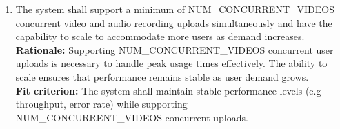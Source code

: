 \documentclass[12pt]{article}
\begin{document}
\begin{enumerate}[label={PR-CR}4. ]
  \item The system shall support a minimum of NUM\_CONCURRENT\_VIDEOS concurrent video and audio recording uploads simultaneously and have the capability to scale to accommodate more users as demand increases.\\
  \textbf{Rationale: }Supporting NUM\_CONCURRENT\_VIDEOS concurrent user uploads is necessary to handle peak usage times effectively. The ability to scale ensures that performance remains stable as user demand grows.\\
  \textbf{Fit criterion: }The system shall maintain stable performance levels (e.g throughput, error rate) while supporting\\ NUM\_CONCURRENT\_VIDEOS concurrent uploads.  
\end{enumerate}

\newpage
\end{document}

